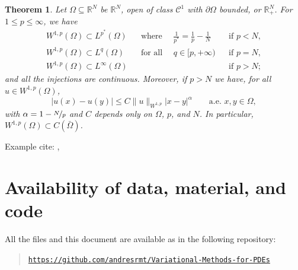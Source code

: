 \documentclass[a4paper,doc,11pt]{article}
\newtheorem{theorem}{Theorem}[section]
\newcommand{\R}{\mathbb{R}}
\newcommand{\CC}{\mathcal{C}}
\begin{document}
\begin{theorem}
    Let \( \Omega \subseteq \R^N \)  be \( \R^N\), open of class \(\CC^1\) with \(\partial \Omega\) bounded, or \( \R^N_+\). For \( 1\leq p \leq \infty\), we have
    \begin{align}
        W^{1,p} (\Omega) \subset L^{p^*} (\Omega) && \text{where } \quad\frac{1}{p^*} = \frac{1}{p} - \frac{1}{N} && \text{if } p < N,
        \\
        W^{1,p} (\Omega) \subset L^{q} (\Omega) && \text{for all } \quad q \in [p,+\infty) && \text{if } p = N,
        \\
        W^{1,p} (\Omega) \subset L^{\infty} (\Omega) &&  && \text{if } p > N;
    \end{align}
    and all the injections are continuous. Moreover, if \(p > N\) we have, for all \(u \in W^{1,p} (\Omega)\),
    \[
        |u(x) - u(y)| \leq C\|u\|_{W^{1,p}} |x-y|^\alpha \qquad \text{a.e. }  x,y \in \Omega,
    \]
    with \(\alpha = 1 - \nicefrac N p\) and \(C\) depends only on \(\Omega\), \(p\), and \(N\). In particular, \( W^{1,p} (\Omega) \subset C(\bar \Omega)\).
\end{theorem}















\vspace{2\baselineskip}

Example cite:
\citet{Brezis2010}, \citep{Brezis2010}







\section*{Availability of data, material, and code}
{

All the files and this document are available as in the following repository:
\begin{quote}
    \noindent \href{https://github.com/andresrmt/Variational-Methods-for-PDEs}{\texttt{https://github.com/andresrmt/Variational-Methods-for-PDEs}}
\end{quote}



}

\newpage



\end{document}
